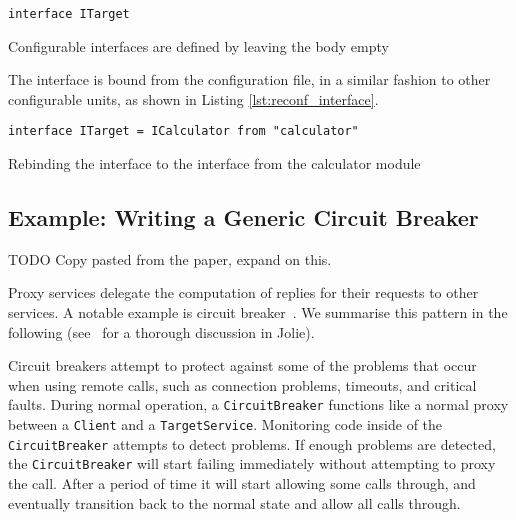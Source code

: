 \begin{listing}[H]
\begin{verbatim}
interface ITarget
\end{verbatim}
\caption{Configurable interfaces are defined by leaving the body empty}
\label{lst:ext_interfaces}
\end{listing}

The interface is bound from the configuration file, in a similar fashion to
other configurable units, as shown in Listing \ref{lst:reconf_interface}.

\begin{listing}[H]
\begin{verbatim}
interface ITarget = ICalculator from "calculator"
\end{verbatim}

\caption{Rebinding the  interface to the 
    interface from the calculator module}

\label{lst:reconf_interface}
\end{listing}


\subsection{Example: Writing a Generic Circuit Breaker}

TODO Copy pasted from the paper, expand on this.


Proxy services delegate the computation of replies for their requests to other
services. A notable example is circuit breaker~\cite{N07}.
%
We summarise this pattern in the following
(see~\cite{DBLP:journals/corr/MontesiW16} for a thorough discussion in Jolie).

Circuit breakers attempt to protect against some of the problems that occur
when using remote calls, such as connection problems, timeouts, and critical
faults.
%
During normal operation, a \lstinline|CircuitBreaker| functions like a normal
proxy between a \lstinline|Client| and a \lstinline|TargetService|.  Monitoring
code inside of the \lstinline|CircuitBreaker| attempts to detect problems. If
enough problems are detected, the \lstinline|CircuitBreaker| will start failing
immediately without attempting to proxy the call. After a period of time it
will start allowing some calls through, and eventually transition back to the
normal state and allow all calls through.

